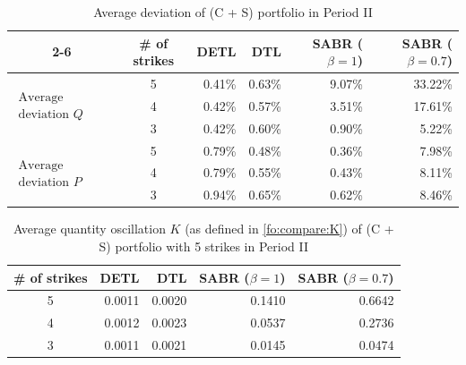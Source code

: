 \documentclass{article}
\numberwithin{equation}{section}
\begin{document}
\begin{table}[h]
\centering
 \caption{Average deviation of (C + S) portfolio in Period II}\label{tb:compare:pA2}
\begin{tabular}{|c|c|r|r|r|r|} 
\cline{2-6}
\multicolumn{1}{r|}{}&  \# of strikes & DETL &  DTL & SABR ($\beta = 1$) & SABR ($\beta = 0.7$) \\ 
\hline \hline
\multirow{3}{*}{$\begin{array}{c}  \text{Average realized}\\ \text{deviation } Q  \end{array}$} &  5 & 0.41\% & 0.63\% & 9.07\% & 33.22\%\\ \cline{2-6}
& 4 & 0.42\% & 0.57\% & 3.51\% & 17.61\%\\ \cline{2-6}
& 3 & 0.42\% & 0.60\% & 0.90\% & 5.22\%\\
\hline \hline
\multirow{3}{*}{$\begin{array}{c}  \text{Average predicted}\\ \text{deviation } P  \end{array}$}  &  5 & 0.79\% & 0.48\% & 0.36\% & 7.98\% \\ \cline{2-6}
& 4 & 0.79\% & 0.55\% & 0.43\% & 8.11\%\\ \cline{2-6}
& 3 & 0.94\% & 0.65\%& 0.62\% & 8.46\% \\ 
\hline
\end{tabular}
\end{table}

\begin{table}[hb]
\centering
 \caption{Average quantity oscillation $K$ (as defined in \eqref{fo:compare:K}) of (C + S) portfolio with 5 strikes in Period II}\label{tb:compare:qA2}
\begin{tabular}{|c|r|r|r|r|} 
\hline
\# of strikes & DETL &  DTL & SABR ($\beta = 1$) & SABR ($\beta = 0.7$) \\ \hline
5 & 0.0011 & 0.0020 & 0.1410 & 0.6642 \\ \hline
4 & 0.0012 & 0.0023 & 0.0537 & 0.2736 \\ \hline
3 & 0.0011 & 0.0021 & 0.0145 & 0.0474 \\ 
\hline
\end{tabular}
\end{table}








\end{document}
